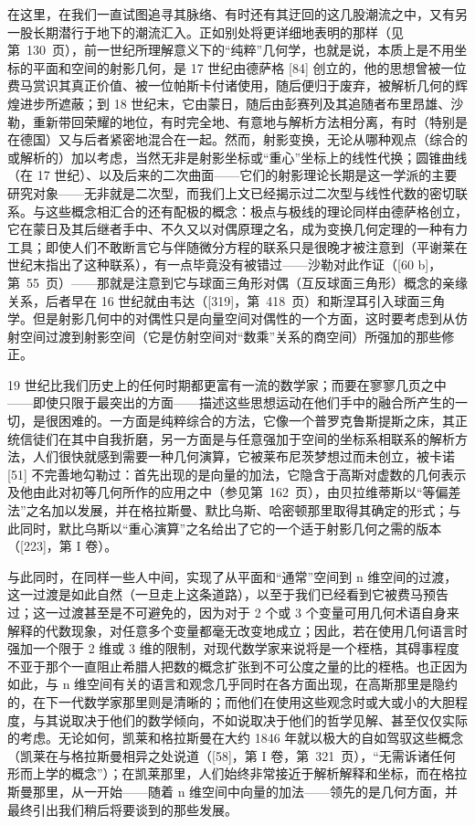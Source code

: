 在这里，在我们一直试图追寻其脉络、有时还有其迂回的这几股潮流之中，又有另一股长期潜行于地下的潮流汇入。正如别处将更详细地表明的那样（见第~130~页），前一世纪所理解意义下的“纯粹”几何学，也就是说，本质上是不用坐标的平面和空间的射影几何，是 17 世纪由德萨格 {[}84{]} 创立的，他的思想曾被一位费马赏识其真正价值、被一位帕斯卡付诸使用，随后便归于废弃，被解析几何的辉煌进步所遮蔽；到 18 世纪末，它由蒙日，随后由彭赛列及其追随者布里昂雄、沙勒，重新带回荣耀的地位，有时完全地、有意地与解析方法相分离，有时（特别是在德国）又与后者紧密地混合在一起。然而，射影变换，无论从哪种观点（综合的或解析的）加以考虑，当然无非是射影坐标或“重心”坐标上的线性代换；圆锥曲线（在 17 世纪）、以及后来的二次曲面——它们的射影理论长期是这一学派的主要研究对象——无非就是二次型，而我们上文已经揭示过二次型与线性代数的密切联系。与这些概念相汇合的还有配极的概念：极点与极线的理论同样由德萨格创立，它在蒙日及其后继者手中、不久又以对偶原理之名，成为变换几何定理的一种有力工具；即使人们不敢断言它与伴随微分方程的联系只是很晚才被注意到（平谢莱在世纪末指出了这种联系），有一点毕竟没有被错过——沙勒对此作证（{[}60 b{]}，第~55~页）——那就是注意到它与球面三角形对偶（互反球面三角形）概念的亲缘关系，后者早在 16 世纪就由韦达（{[}319{]}，第~418~页）和斯涅耳引入球面三角学。但是射影几何中的对偶性只是向量空间对偶性的一个方面，这时要考虑到从仿射空间过渡到射影空间（它是仿射空间对“数乘”关系的商空间）所强加的那些修正。

19 世纪比我们历史上的任何时期都更富有一流的数学家；而要在寥寥几页之中——即使只限于最突出的方面——描述这些思想运动在他们手中的融合所产生的一切，是很困难的。一方面是纯粹综合的方法，它像一个普罗克鲁斯提斯之床，其正统信徒们在其中自我折磨，另一方面是与任意强加于空间的坐标系相联系的解析方法，人们很快就感到需要一种几何演算，它被莱布尼茨梦想过而未创立，被卡诺 {[}51{]} 不完善地勾勒过：首先出现的是向量的加法，它隐含于高斯对虚数的几何表示及他由此对初等几何所作的应用之中（参见第~162~页），由贝拉维蒂斯以“等偏差法”之名加以发展，并在格拉斯曼、默比乌斯、哈密顿那里取得其确定的形式；与此同时，默比乌斯以“重心演算”之名给出了它的一个适于射影几何之需的版本（{[}223{]}，第 I 卷）。

与此同时，在同样一些人中间，实现了从平面和“通常”空间到 n 维空间的过渡，这一过渡是如此自然（一旦走上这条道路），以至于我们已经看到它被费马预告过；这一过渡甚至是不可避免的，因为对于 2 个或 3 个变量可用几何术语自身来解释的代数现象，对任意多个变量都毫无改变地成立；因此，若在使用几何语言时强加一个限于 2 维或 3 维的限制，对现代数学家来说将是一个桎梏，其碍事程度不亚于那个一直阻止希腊人把数的概念扩张到不可公度之量的比的桎梏。也正因为如此，与 n 维空间有关的语言和观念几乎同时在各方面出现，在高斯那里是隐约的，在下一代数学家那里则是清晰的；而他们在使用这些观念时或大或小的大胆程度，与其说取决于他们的数学倾向，不如说取决于他们的哲学见解、甚至仅仅实际的考虑。无论如何，凯莱和格拉斯曼在大约 1846 年就以极大的自如驾驭这些概念（凯莱在与格拉斯曼相异之处说道（{[}58{]}，第 I 卷，第~321~页），“无需诉诸任何形而上学的概念”）；在凯莱那里，人们始终非常接近于解析解释和坐标，而在格拉斯曼那里，从一开始——随着 n 维空间中向量的加法——领先的是几何方面，并最终引出我们稍后将要谈到的那些发展。

